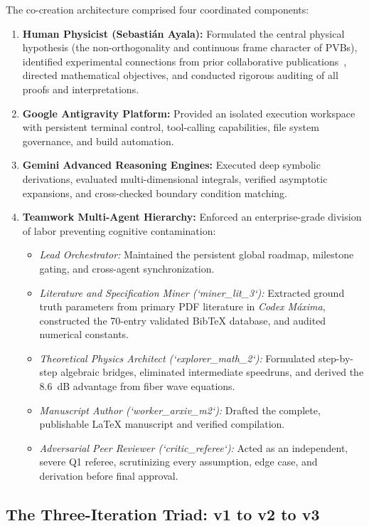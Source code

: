 \documentclass{optica-article}
\begin{document}
The co-creation architecture comprised four coordinated components:
\begin{enumerate}
    \item \textbf{Human Physicist (Sebastián Ayala):} Formulated the central physical hypothesis (the non-orthogonality and continuous frame character of PVBs), identified experimental connections from prior collaborative publications~\cite{Villalba2023,RojasRojas2021,Canas2021,Ferreira2026}, directed mathematical objectives, and conducted rigorous auditing of all proofs and interpretations.
    \item \textbf{Google Antigravity Platform:} Provided an isolated execution workspace with persistent terminal control, tool-calling capabilities, file system governance, and build automation.
    \item \textbf{Gemini Advanced Reasoning Engines:} Executed deep symbolic derivations, evaluated multi-dimensional integrals, verified asymptotic expansions, and cross-checked boundary condition matching.
    \item \textbf{Teamwork Multi-Agent Hierarchy:} Enforced an enterprise-grade division of labor preventing cognitive contamination:
    \begin{itemize}
        \item \emph{Lead Orchestrator:} Maintained the persistent global roadmap, milestone gating, and cross-agent synchronization.
        \item \emph{Literature and Specification Miner (`miner\_lit\_3`):} Extracted ground truth parameters from primary PDF literature in \emph{Codex Máxima}, constructed the 70-entry validated BibTeX database, and audited numerical constants.
        \item \emph{Theoretical Physics Architect (`explorer\_math\_2`):} Formulated step-by-step algebraic bridges, eliminated intermediate speedruns, and derived the 8.6~dB advantage from fiber wave equations.
        \item \emph{Manuscript Author (`worker\_arxiv\_m2`):} Drafted the complete, publishable LaTeX manuscript and verified compilation.
        \item \emph{Adversarial Peer Reviewer (`critic\_referee`):} Acted as an independent, severe Q1 referee, scrutinizing every assumption, edge case, and derivation before final approval.
    \end{itemize}
\end{enumerate}

\subsection{The Three-Iteration Triad: v1 to v2 to v3}
\end{document}
